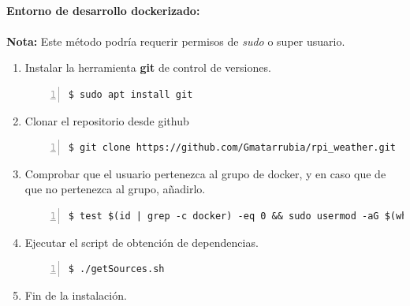 \paragraph{Entorno de desarrollo dockerizado:}

\paragraph{}\textbf{Nota:} Este método podría requerir permisos de \emph{sudo} o super
usuario.

\begin{enumerate}
    \item Instalar la herramienta \textbf{\gls{git}} de control de versiones.
    \begin{lstlisting}[style=consola, numbers=left]
        $ sudo apt install git
    \end{lstlisting}

    \item Clonar el repositorio desde github
    \begin{lstlisting}[style=consola, numbers=left]
        $ git clone https://github.com/Gmatarrubia/rpi_weather.git
    \end{lstlisting}

    \item Comprobar que el usuario pertenezca al grupo de docker, y en caso que de
    que no pertenezca al grupo, añadirlo.
    \begin{lstlisting}[style=consola, numbers=left]
        $ test $(id | grep -c docker) -eq 0 && sudo usermod -aG $(whoami) docker
    \end{lstlisting}

    \item Ejecutar el script de obtención de dependencias.
    \begin{lstlisting}[style=consola, numbers=left]
        $ ./getSources.sh
    \end{lstlisting}

    \item Fin de la instalación.
\end{enumerate}

